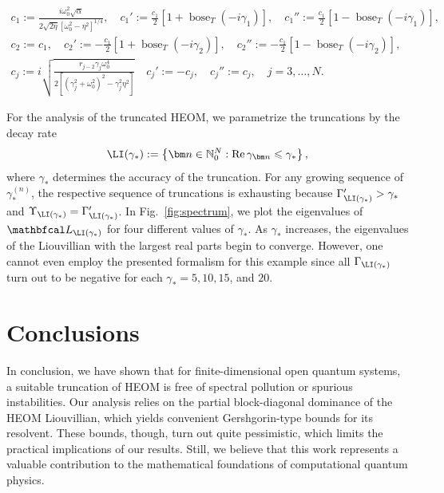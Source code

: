 \documentclass{SciPost}
\renewcommand{\Re}{\operatorname{Re}}
\begin{document}
\begin{equation}
    \begin{gathered}
        c_1 := \frac{i \omega_0^2 \sqrt{\alpha}}{2 \sqrt{2 \eta} \left[\omega_0^2 - \eta^2\right]^{1/4}}, \quad
        c_1' := \frac{c_1}{2}\left[1 + \operatorname{bose}_T(-i \gamma_1)\right], \quad
        c_1'' := \frac{c_1}{2}\left[1 - \operatorname{bose}_T(-i \gamma_1)\right],\\
        c_2 := c_1, \quad 
        c_2' := -\frac{c_1}{2}\left[1 + \operatorname{bose}_T(-i \gamma_2)\right], \quad
        c_2'' := -\frac{c_1}{2}\left[1 - \operatorname{bose}_T(-i \gamma_2)\right],\\
        c_j := i \sqrt{\frac{r_{j-2} \gamma_j \omega_0^4}{2 \left[(\gamma_j^2 + \omega_0^2)^2 - \gamma_j^2 \eta^2\right]}} \quad
        c_j' := -c_j, \quad c_j'' := c_j,\quad j = 3, \ldots, N.
    \end{gathered}
\end{equation}

For the analysis of the truncated HEOM, we parametrize the truncations by the decay rate
\begin{equation}
    \LI(\gamma_\ast) := \left \{\bm n \in \mathbb N_0^N: \Re \gamma_{\bm n} \leqslant \gamma_\ast\right \},
\end{equation}
where $\gamma_\ast$ determines the accuracy of the truncation. For any growing sequence of $\gamma_\ast^{(n)}$, the respective sequence of truncations is exhausting because $\Gamma'_{\LI(\gamma_\ast)} > \gamma_\ast$ and $\Upsilon_{\LI(\gamma_\ast)} = \Gamma'_{\LI(\gamma_\ast)}$.
In Fig.~\ref{fig:spectrum}, we plot the eigenvalues of \(\mathbfcal L_{\LI(\gamma_\ast)}\) for four different values of \(\gamma_\ast\). As \(\gamma_\ast\) increases, the eigenvalues of the Liouvillian with the largest real parts begin to converge. However, one cannot even employ the presented formalism for this example since all $\Gamma_{\LI(\gamma_\ast)}$ turn out to be negative for each $\gamma_\ast = 5, 10, 15$, and $20$.

\section{Conclusions}
\label{sec:conclusions}

In conclusion, we have shown that for finite-dimensional open quantum systems, a suitable truncation of HEOM is free of spectral pollution or spurious instabilities. Our analysis relies on the partial block-diagonal dominance of the HEOM Liouvillian, which yields convenient Gershgorin-type bounds for its resolvent. These bounds, though, turn out quite pessimistic, which limits the practical implications of our results. Still, we believe that this work represents a valuable contribution to the mathematical foundations of computational quantum physics. 
\end{document}
